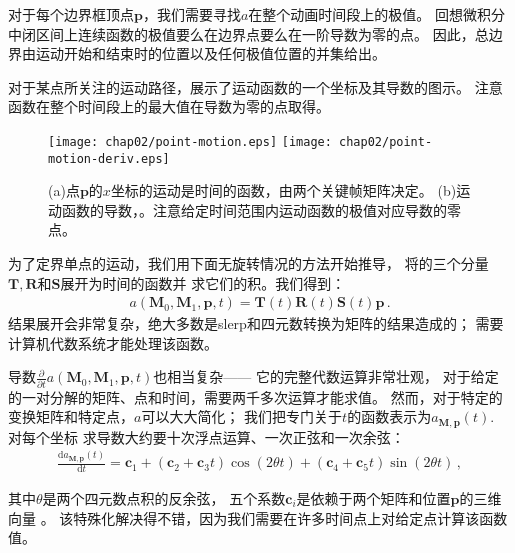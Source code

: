 对于每个边界框顶点$\bm p$，我们需要寻找$a$在整个动画时间段上的极值。
回想微积分中闭区间上连续函数的极值要么在边界点要么在一阶导数为零的点。
因此，总边界由运动开始和结束时的位置以及任何极值位置的并集给出。

对于某点所关注的运动路径，展示了运动函数的一个坐标及其导数的图示。
注意函数在整个时间段上的最大值在导数为零的点取得。
\begin{figure}[htbp]
    \centering
    \texttt{[image: chap02/point-motion.eps]}
    \texttt{[image: chap02/point-motion-deriv.eps]}
    \caption{(a)点$\bm p$的$x$坐标的运动是时间的函数，由两个关键帧矩阵决定。
        (b)运动函数的导数，。注意给定时间范围内运动函数的极值对应导数的零点。}
    \label{fig:2.18}
\end{figure}

为了定界单点的运动，我们用下面无旋转情况的方法开始推导，
将的三个分量$\bm T,\bm R$和$\bm S$展开为时间的函数并
求它们的积。我们得到：
\begin{align}\label{eq:2.11}
    a(\bm M_0,\bm M_1,\bm p,t)=\bm T(t)\bm R(t)\bm S(t)\bm p\, .
\end{align}
结果展开会非常复杂，绝大多数是slerp和四元数转换为矩阵的结果造成的；
需要计算机代数系统才能处理该函数。

导数$\displaystyle\frac{\partial}{\partial t}a(\bm M_0,\bm M_1,\bm p,t)$也相当复杂——
它的完整代数运算非常壮观，
对于给定的一对分解的矩阵、点和时间，需要两千多次运算才能求值。
然而，对于特定的变换矩阵和特定点，$a$可以大大简化；
我们把专门关于$t$的函数表示为$a_{\bm M,\bm p}(t)$.
对每个坐标
求导数大约要十次浮点运算、一次正弦和一次余弦：
\begin{align}\label{eq:2.12}
    \frac{\mathrm{d}a_{\bm M,\bm p}(t)}{\mathrm{d}t}=\bm c_1+(\bm c_2+\bm c_3t)\cos(2\theta t)+(\bm c_4+\bm c_5t)\sin(2\theta t)\, ,
\end{align}

其中$\theta$是两个四元数点积的反余弦，
五个系数$\bm c_i$是依赖于两个矩阵和位置$\bm p$的三维向量
。
该特殊化解决得不错，因为我们需要在许多时间点上对给定点计算该函数值。

